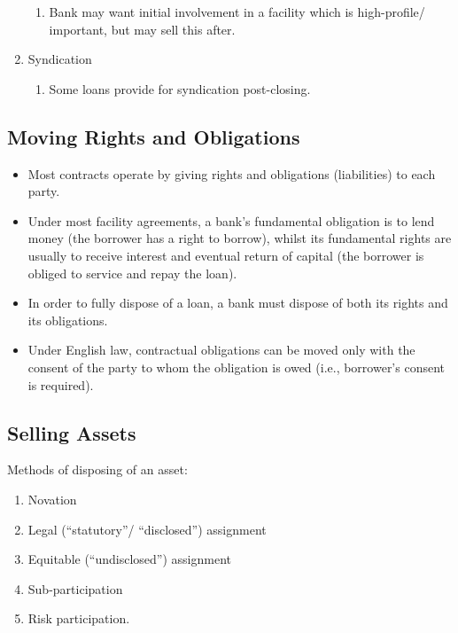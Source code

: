 \documentclass[
]{article}
\providecommand{\tightlist}{%
  \setlength{\itemsep}{0pt}\setlength{\parskip}{0pt}}
\begin{document}
\begin{enumerate}
  \begin{enumerate}
  \tightlist
  \item
    Bank may want initial involvement in a facility which is
    high-profile/ important, but may sell this after.
  \end{enumerate}
\item
  Syndication

  \begin{enumerate}
  \tightlist
  \item
    Some loans provide for syndication post-closing.
  \end{enumerate}
\end{enumerate}

\hypertarget{moving-rights-and-obligations}{%
\subsection{Moving Rights and
Obligations}\label{moving-rights-and-obligations}}

\begin{itemize}
\tightlist
\item
  Most contracts operate by giving rights and obligations (liabilities)
  to each party.
\item
  Under most facility agreements, a bank's fundamental obligation is to
  lend money (the borrower has a right to borrow), whilst its
  fundamental rights are usually to receive interest and eventual return
  of capital (the borrower is obliged to service and repay the loan).
\item
  In order to fully dispose of a loan, a bank must dispose of both its
  rights and its obligations.
\item
  Under English law, contractual obligations can be moved only with the
  consent of the party to whom the obligation is owed (i.e., borrower's
  consent is required).
\end{itemize}

\hypertarget{selling-assets}{%
\subsection{Selling Assets}\label{selling-assets}}

Methods of disposing of an asset:

\begin{enumerate}
\tightlist
\item
  Novation
\item
  Legal (``statutory''/ ``disclosed'') assignment
\item
  Equitable (``undisclosed'') assignment
\item
  Sub-participation
\item
  Risk participation.
\end{enumerate}
\end{document}
